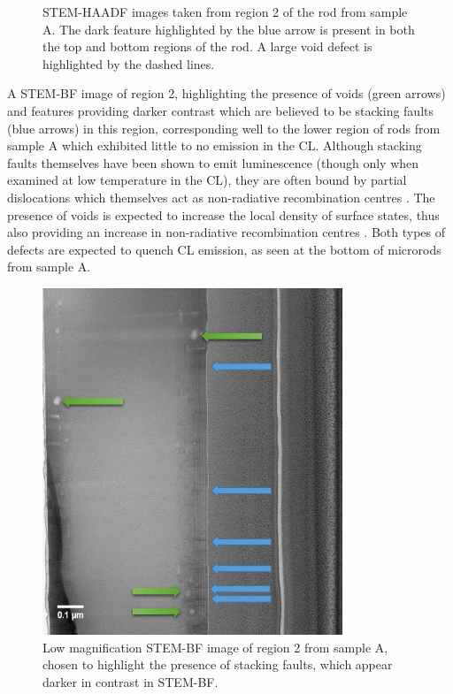 \begin{figure}[!h]
	\caption{STEM-HAADF images taken from region 2 of the rod from sample A. The dark feature highlighted by the blue arrow is present in both the top and bottom regions of the rod. A large void defect is highlighted by the dashed lines.}
	\label{A34}
\end{figure}
\FloatBarrier

A STEM-BF image of region 2, highlighting the presence of voids (green arrows) and features providing darker contrast which are believed to be stacking faults (blue arrows) in this region, corresponding well to the lower region of rods from sample A which exhibited little to no emission in the CL. Although stacking faults themselves have been shown to emit luminescence (though only when examined at low temperature in the CL), they are often bound by partial dislocations which themselves act as non-radiative recombination centres \cite{Lahnemann2014}. The presence of voids is expected to increase the local density of surface states, thus also providing an increase in non-radiative recombination centres \cite{Yankovich2012}. Both types of defects are expected to quench CL emission, as seen at the bottom of microrods from sample A. 

\begin{figure}[!h]
	\centering
	\includegraphics[width=0.8\textwidth]{Figs/Ch6/A3stem}
	\caption{ Low magnification STEM-BF image of region 2 from sample A, chosen to highlight the presence of stacking faults, which appear darker in contrast in STEM-BF.}
	\label{stembf}
\end{figure}

